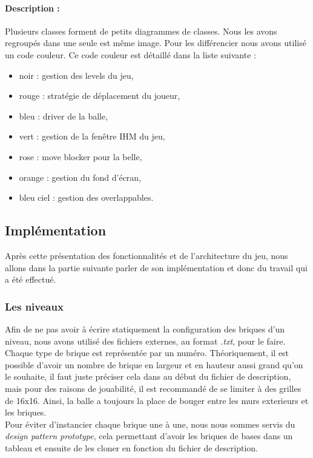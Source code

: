 \documentclass[a4paper,10pt]{article}
\begin{document}
 		\paragraph{Description :}
 		Plusieurs classes forment de petits diagrammes de classes. Nous les avons regroupés dans une seule est même image. Pour les différencier
 		nous avons utilisé un code couleur. Ce code couleur est détaillé dans la liste suivante : \\
 		\begin{itemize}
 		\item noir : gestion des levels du jeu,
 		\item rouge : stratégie de déplacement du joueur,
 		\item bleu : driver de la balle,
 		\item vert : gestion de la fenêtre IHM du jeu,
 		\item rose : move blocker pour la belle,
 		\item orange : gestion du fond d'écran,
 		\item bleu ciel : gestion des overlappables.
 		\end{itemize}


\subsection{Implémentation}
    Après cette présentation des fonctionnalités et de l'architecture du jeu, nous allons dans la partie suivante
    parler de son implémentation et donc du travail qui a été effectué.

    \subsubsection{Les niveaux}
        Afin de ne pas avoir à écrire statiquement la configuration des briques d'un niveau, nous avons
        utilisé des fichiers externes, au format \textit{.txt}, pour le faire. Chaque type de brique est représentée par un numéro.
        Théoriquement, il est possible d'avoir un nombre de brique en largeur et en hauteur aussi grand qu'on le souhaite,
        il faut juste préciser cela dans au début du fichier de description, mais pour des raisons de jouabilité, il
        est recommandé de se limiter à des grilles de 16x16. Ainsi, la balle a toujours la place de bouger entre les murs 
        exterieurs et les briques. \\

        Pour éviter d'instancier chaque brique une à une, nous nous sommes servis du \textit{design pattern prototype},
        cela permettant d'avoir les briques de bases dans un tableau et ensuite de les cloner en fonction du
        fichier de description.
\end{document}
